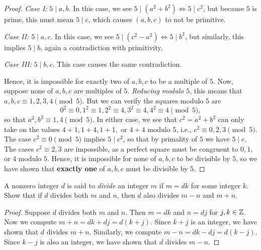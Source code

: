 \documentclass{article}
\begin{document}
\begin{exercise}[Chapter 2 \#1]
\begin{proof}
\textit{Case I:} $5\mid a,b$. In this case, we see $5\mid (a^2+b^2)\iff 5\mid c^2$, but because $5$ is prime, this must mean $5\mid c$, which causes $(a,b,c)$ to not be primitive. \newpage

\textit{Case II:} $5\mid a,c$. In this case, we see $5\mid (c^2-a^2) \iff 5\mid b^2$, but similarly, this implies $5\mid b$, again a contradiction with primitivity.

\textit{Case III:} $5\mid b,c$. This case causes the same contradiction.

Hence, it is impossible for exactly two of $a,b,c$ to be a multiple of $5$. Now, suppose none of $a,b,c$ are multiples of $5$. \textit{Reducing modulo $5$}, this means that $a,b,c\equiv 1,2,3,4 \pmod 5$. But we can verify the squares modulo $5$ are
$$0^2 \equiv 0, 1^2 \equiv 1, 2^2\equiv 4, 3^2\equiv 4, 4^2\equiv 4 \pmod 5,$$
so that $a^2,b^2\equiv 1, 4 \pmod 5$. In either case, we see that $c^2 = a^2+b^2$ can only take on the values $4+1, 1+4, 1+1,$ or $4+4$ modulo $5$, i.e., $c^2\equiv 0, 2, 3\pmod 5$. The case $c^2\equiv 0 \pmod 5$ implies $5\mid c^2$, so that by primality of $5$ we have $5\mid c$. The cases $c^2\equiv 2,3$ are impossible, as a perfect square must be congruent to $0, 1,$ or $4$ modulo $5$. Hence, it is impossible for none of $a,b,c$ to be divisible by $5$, so we have shown that \textbf{exactly one} of $a,b,c$ must be divisible by $5$.
\end{proof}
\end{exercise}

\begin{exercise}[Chapter 2 \#2]
A nonzero integer $d$ is said to \textit{divide} an integer $m$ if $m=dk$ for some integer $k$. Show that if $d$ divides both $m$ and $n$, then $d$ also divides $m-n$ and $m+n$.
\end{exercise}
\begin{proof}
Suppose $d$ divides both $m$ and $n$. Then $m = dk$ and $n = dj$ for $j,k\in\mathbb Z$. Now we compute $m+n = dk + dj = d(k+j)$. Since $k+j$ is an integer, we have shown that $d$ divides $m+n$. Similarly, we compute $m-n = dk-dj = d(k-j)$. Since $k-j$ is also an integer, we have shown that $d$ divides $m-n$.
\end{proof}
\end{document}

